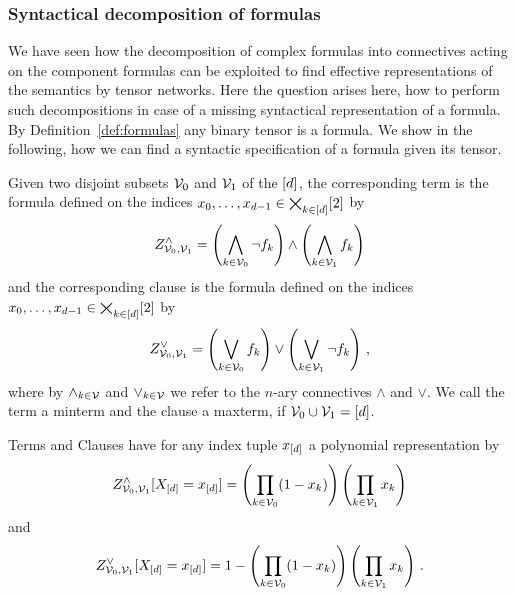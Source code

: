 \subsubsection{Syntactical decomposition of formulas}\label{sec:termClauseDecomposition}

We have seen how the decomposition of complex formulas into connectives acting on the component formulas can be exploited to find effective representations of the semantics by tensor networks.
Here the question arises here, how to perform such decompositions in case of a missing syntactical representation of a formula.
By Definition~\ref{def:formulas} any binary tensor is a formula.
We show in the following, how we can find a syntactic specification of a formula given its tensor.

%


\begin{definition}\label{def:clauses}
	Given two disjoint subsets $\mathcal{V}_0$ and $\mathcal{V}_1$ of the $[d]$, the corresponding term is the formula defined on the indices $x_{0},\ldots,x_{d-1}\in\bigtimes_{k\in[d]}[2]$ by
		\[ Z^{\land}_{\mathcal{V}_0,\mathcal{V}_1}
		=\left( \bigwedge_{k\in\mathcal{V}_0} \lnot f_{k} \right)  \land \left( \bigwedge_{k\in\mathcal{V}_1} f_{k} \right)  \]
	and the corresponding clause is the formula defined on the indices $x_{0},\ldots,x_{d-1}\in\bigtimes_{k\in[d]}[2]$ by
		\[ Z^{\lor}_{\mathcal{V}_0,\mathcal{V}_1}
		=\left( \bigvee_{k\in\mathcal{V}_0} f_{k} \right)  \lor \left( \bigvee_{k\in\mathcal{V}_1} \lnot f_{k} \right)  \, , \]
	where by $\land_{k\in\mathcal{V}}$ and $\lor_{k\in\mathcal{V}}$ we refer to the $n$-ary connectives $\land$ and $\lor$.
	We call the term a minterm and the clause a maxterm, if $\mathcal{V}_0\cup\mathcal{V}_1 = [d]$.
\end{definition}

Terms and Clauses have for any index tuple $x_{[d]}$ a polynomial representation by
		\[ Z^{\land}_{\mathcal{V}_0,\mathcal{V}_1}[X_{[d]}=x_{[d]}] 
		= \left( \prod_{k \in \mathcal{V}_0} (1-x_{k}) \right)
		\left(  \prod_{k \in \mathcal{V}_1} x_{k} \right) \]
and
		\[ Z^{\lor}_{\mathcal{V}_0,\mathcal{V}_1}[X_{[d]}=x_{[d]}] 
		= 1 - \left( \prod_{k \in \mathcal{V}_0} (1-x_{k})\right)
		\left(  \prod_{k \in \mathcal{V}_1} x_{k} \right) \, . \]


